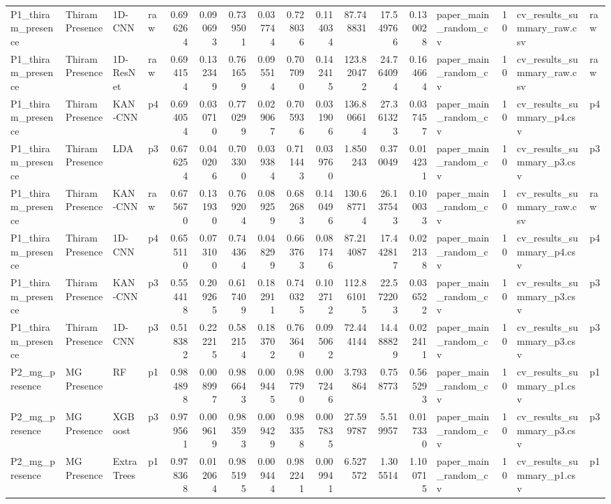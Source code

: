 \begin{tabular}{llllrrrrrrrrrlrll}
P1_thiram_presence & Thiram Presence & 1D-CNN & raw & 0.696264 & 0.090693 & 0.739501 & 0.037744 & 0.728036 & 0.114034 & 87.748831 & 17.549766 & 0.130028 & paper_main_random_cv & 10 & cv_results_summary_raw.csv & raw \\
P1_thiram_presence & Thiram Presence & 1D-ResNet & raw & 0.694154 & 0.132349 & 0.761659 & 0.095514 & 0.707090 & 0.142415 & 123.820472 & 24.764094 & 0.164664 & paper_main_random_cv & 10 & cv_results_summary_raw.csv & raw \\
P1_thiram_presence & Thiram Presence & KAN-CNN & p4 & 0.694054 & 0.030710 & 0.770299 & 0.029067 & 0.705936 & 0.031906 & 136.806614 & 27.361323 & 0.037457 & paper_main_random_cv & 10 & cv_results_summary_p4.csv & p4 \\
P1_thiram_presence & Thiram Presence & LDA & p3 & 0.676254 & 0.040206 & 0.703300 & 0.039384 & 0.711443 & 0.039760 & 1.850243 & 0.370049 & 0.014231 & paper_main_random_cv & 10 & cv_results_summary_p3.csv & p3 \\
P1_thiram_presence & Thiram Presence & KAN-CNN & raw & 0.675670 & 0.131930 & 0.769204 & 0.089259 & 0.682683 & 0.140496 & 130.687714 & 26.137543 & 0.100033 & paper_main_random_cv & 10 & cv_results_summary_raw.csv & raw \\
P1_thiram_presence & Thiram Presence & 1D-CNN & p4 & 0.655110 & 0.073100 & 0.744364 & 0.048299 & 0.663763 & 0.081746 & 87.214087 & 17.442817 & 0.022138 & paper_main_random_cv & 10 & cv_results_summary_p4.csv & p4 \\
P1_thiram_presence & Thiram Presence & KAN-CNN & p3 & 0.554418 & 0.209265 & 0.617409 & 0.182911 & 0.740325 & 0.102712 & 112.861015 & 22.572203 & 0.036522 & paper_main_random_cv & 10 & cv_results_summary_p3.csv & p3 \\
P1_thiram_presence & Thiram Presence & 1D-CNN & p3 & 0.518382 & 0.222215 & 0.582154 & 0.183702 & 0.763640 & 0.095062 & 72.444144 & 14.488829 & 0.022411 & paper_main_random_cv & 10 & cv_results_summary_p3.csv & p3 \\
P2_mg_presence & MG Presence & RF & p1 & 0.984898 & 0.008997 & 0.986643 & 0.009445 & 0.987790 & 0.007246 & 3.793864 & 0.758773 & 0.565293 & paper_main_random_cv & 10 & cv_results_summary_p1.csv & p1 \\
P2_mg_presence & MG Presence & XGBoost & p3 & 0.979561 & 0.009619 & 0.983593 & 0.009429 & 0.983358 & 0.007835 & 27.599787 & 5.519957 & 0.017330 & paper_main_random_cv & 10 & cv_results_summary_p3.csv & p3 \\
P2_mg_presence & MG Presence & ExtraTrees & p1 & 0.978368 & 0.012064 & 0.985195 & 0.009444 & 0.982241 & 0.009941 & 6.527572 & 1.305514 & 1.100715 & paper_main_random_cv & 10 & cv_results_summary_p1.csv & p1 \\

\end{tabular}
